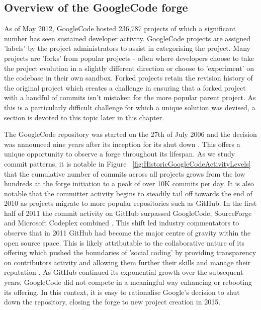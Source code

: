 \subsection{Overview of the GoogleCode forge}
As of May 2012, GoogleCode hosted 236,787 projects of which a significant number has seen sustained developer activity. GoogleCode projects are assigned 'labels' by the project administrators to assist in categorising the project. Many projects are 'forks' from popular projects - often where developers choose to take the project evolution in a slightly different direction or choose to 'experiment' on the codebase in their own sandbox. Forked projects retain the revision history of the original project which creates a challenge in ensuring that a forked project with a handful of commits isn't mistaken for the more popular parent project. As this is a particularly difficult challenge for which a unique solution was devised, a section is devoted to this topic later in this chapter.

The GoogleCode repository was started on the 27th of July 2006 \citep{shankland2006google} and the decision was announced nine years after its inception for its shut down \citep{dibona2006bidding}. This offers a unique opportunity to observe a forge throughout its lifespan. As we study commit patterns, it is notable in Figure ~\ref{fig:HistoricGoogleCodeActivityLevels} that the cumulative number of commits across all projects grows from the low hundreds at the forge initiation to a peak of over 10K commits per day. It is also notable that the committer activity begins to steadily tail off towards the end of 2010 as projects migrate to more popular repositories such as GitHub. In the first half of 2011 the commit activity on GitHub surpassed GoogleCode, SourceForge and Microsoft Codeplex combined \citep{redmonk2011}. This shift led industry commentators to observe that in 2011 GitHub had become the major centre of gravity within the open source space. This is likely attributable to the collaborative nature of its offering which pushed the boundaries of 'social coding' by providing transparency on contributors activity and allowing them further their skills and manage their reputation \citep{dabbish2012social}. As GitHub continued its exponential growth over the subsequent years, GoogleCode did not compete in a meaningful way enhancing or rebooting its offering. In this context, it is easy to rationalise Google's decision to shut down the repository, closing the forge to new project creation in 2015.
 
